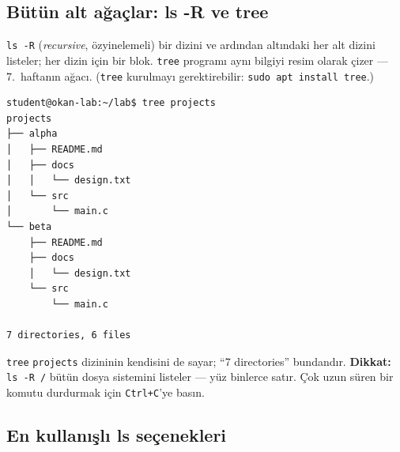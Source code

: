 \documentclass[11pt,a4paper]{article}
\newcommand{\cmd}[1]{\texttt{#1}}
\begin{document}
\subsection{Bütün alt ağaçlar: ls -R ve tree}

\cmd{ls -R} (\emph{recursive}, özyinelemeli) bir dizini ve ardından altındaki her alt dizini listeler; her dizin için bir blok. \cmd{tree} programı aynı bilgiyi resim olarak çizer --- 7.\ haftanın ağacı. (\cmd{tree} kurulmayı gerektirebilir: \cmd{sudo apt install tree}.)


\begin{tcolorbox}[enhanced,colback=dark,colframe=dark,arc=0pt,boxrule=0pt,left=6pt,right=6pt,top=4pt,bottom=4pt,coltext=light,fontupper=\footnotesize]
\begin{verbatim}
student@okan-lab:~/lab$ tree projects
projects
├── alpha
│   ├── README.md
│   ├── docs
│   │   └── design.txt
│   └── src
│       └── main.c
└── beta
    ├── README.md
    ├── docs
    │   └── design.txt
    └── src
        └── main.c

7 directories, 6 files
\end{verbatim}
\end{tcolorbox}

\cmd{tree} \texttt{projects} dizininin kendisini de sayar; ``7 directories'' bundandır. \textbf{Dikkat:} \cmd{ls -R /} bütün dosya sistemini listeler --- yüz binlerce satır. Çok uzun süren bir komutu durdurmak için \texttt{Ctrl+C}'ye basın.

\subsection{En kullanışlı ls seçenekleri}
\end{document}
